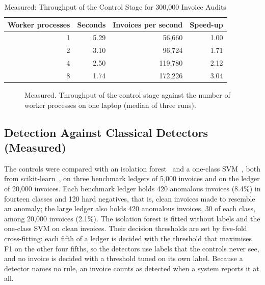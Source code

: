 \documentclass[conference]{IEEEtran}
\begin{document}
\begin{table}[t]
\caption{Measured: Throughput of the Control Stage for 300{,}000 Invoice Audits}
\label{tab:scal}
\centering
\footnotesize
\begin{tabular}{rrrr}
\toprule
Worker processes & Seconds & Invoices per second & Speed-up \\
\midrule
1 & 5.29 & 56{,}660 & 1.00 \\
2 & 3.10 & 96{,}724 & 1.71 \\
4 & 2.50 & 119{,}780 & 2.12 \\
8 & 1.74 & 172{,}226 & 3.04 \\
\bottomrule
\end{tabular}
\end{table}

\begin{figure}[t]
\centering
{}
\caption{Measured. Throughput of the control stage against the number of worker processes on one laptop (median of three runs).}
\label{fig:scal}
\end{figure}

\subsection{Detection Against Classical Detectors (Measured)}
\label{sec:detect}
The controls were compared with an isolation forest~\cite{liu2008} and a one-class SVM~\cite{scholkopf2001}, both from scikit-learn~\cite{pedregosa2011}, on three benchmark ledgers of 5{,}000 invoices and on the ledger of 20{,}000 invoices. Each benchmark ledger holds 420 anomalous invoices (8.4\%) in fourteen classes and 120 hard negatives, that is, clean invoices made to resemble an anomaly; the large ledger also holds 420 anomalous invoices, 30 of each class, among 20{,}000 invoices (2.1\%). The isolation forest is fitted without labels and the one-class SVM on clean invoices. Their decision thresholds are set by five-fold cross-fitting: each fifth of a ledger is decided with the threshold that maximises F1 on the other four fifths, so the detectors use labels that the controls never see, and no invoice is decided with a threshold tuned on its own label. Because a detector names no rule, an invoice counts as detected when a system reports it at all.
\end{document}
